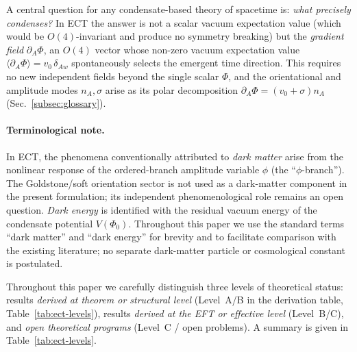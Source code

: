 \documentclass[11pt,a4paper]{article}
\numberwithin{equation}{section}
\begin{document}
A central question for any condensate-based theory of spacetime is:
\textit{what precisely condenses?}
In ECT the answer is not a scalar vacuum expectation value
(which would be $O(4)$-invariant and produce no symmetry breaking)
but the \emph{gradient field} $\partial_A\Phi$,
an $O(4)$ vector whose non-zero vacuum expectation value
$\langle\partial_A\Phi\rangle = v_0\,\delta_{Aw}$
spontaneously selects the emergent time direction.
This requires no new independent fields beyond the single scalar $\Phi$,
and the orientational and amplitude modes $n_A, \sigma$ arise
as its polar decomposition $\partial_A\Phi = (v_0+\sigma)n_A$
(Sec.~\ref{subsec:glossary}).

\paragraph{Terminological note.}
In ECT, the phenomena conventionally attributed to \emph{dark matter}
arise from the nonlinear response of the ordered-branch amplitude variable $\phi$
(the ``$\phi$-branch''). The Goldstone/soft orientation sector is not used
as a dark-matter component in the present formulation; its independent
phenomenological role remains an open question.
\emph{Dark energy} is identified with the residual vacuum energy
of the condensate potential $V(\Phi_0)$.
Throughout this paper we use the standard terms ``dark matter''
and ``dark energy'' for brevity and to facilitate comparison
with the existing literature; no separate dark-matter particle
or cosmological constant is postulated.

Throughout this paper we carefully distinguish three levels of theoretical status:
results \emph{derived at theorem or structural level} (Level~A/B in the derivation
table, Table~\ref{tab:ect-levels}),
results \emph{derived at the EFT or effective level} (Level~B/C),
and \emph{open theoretical programs} (Level~C / open problems).
A summary is given in Table~\ref{tab:ect-levels}.
\end{document}

